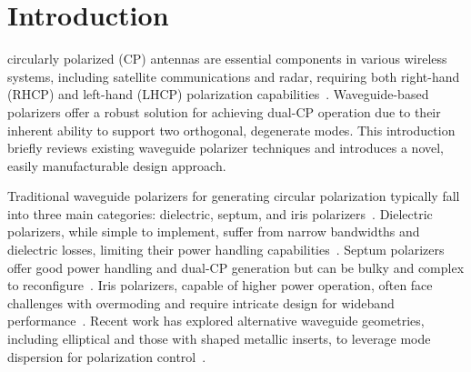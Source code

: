 \documentclass[journal,9pt]{IEEEtran}
\begin{document}
\section{Introduction}

 circularly polarized (CP) antennas are essential components in various wireless systems, including satellite communications and radar, requiring both right-hand (RHCP) and left-hand (LHCP) polarization capabilities~\cite{jia-et-al:dual-circularly-polarized-antennas-with-low-cross-polarization-for-gnss-r-applications, zang-et-al:single-layer-dual-circularly-polarized-antenna-elements-for-automotive-radar-at-77-ghz}. Waveguide-based polarizers offer a robust solution for achieving dual-CP operation due to their inherent ability to support two orthogonal, degenerate modes. This introduction briefly reviews existing waveguide polarizer techniques and introduces a novel, easily manufacturable design approach.

Traditional waveguide polarizers for generating circular polarization typically fall into three main categories: dielectric, septum, and iris polarizers~\cite{shuliak-et-al:modern-microwave-polarizers-and-their-electromagnetic-characteristics, arora-et-al:dielectric-polarizer-based-potter-horn-antenna-for-deep-space-on-board-ttc-uplink-applications}. Dielectric polarizers, while simple to implement, suffer from narrow bandwidths and dielectric losses, limiting their power handling capabilities~\cite{melendro-jimenez-et-al:a-novel-logarithmic-spiral-shaped-3d-printed-dielectirc-polarizer-for-dual-circularly-polarized-conical-beam-radiation-patterns-in-the-ka-band}. Septum polarizers offer good power handling and dual-CP generation but can be bulky and complex to reconfigure~\cite{ruiz-cruz-et-al:compact-reconfigurable-waveguide-circular-polarizer, wang-et-al:novel-square-rectangle-waveguide-septum-polarizer}. Iris polarizers, capable of higher power operation, often face challenges with overmoding and require intricate design for wideband performance~\cite{song-et-al:design-of-wideband-quad-ridge-waveguide-polarizer, virone-et-al:optimum-iris-set-concept-for-waveguide-polarizers, piltyay-et-al:new-tunable-iris-post-square-waveguide-polarizers-for-satelliste-information-systems}. Recent work has explored alternative waveguide geometries, including elliptical and those with shaped metallic inserts, to leverage mode dispersion for polarization control~\cite{yu-et-al:a-wideband-circularly-polarized-horn-antenna-with-a-tapered-elliptical-waveguide-polarizer, rud-shpachenko:polarizers-on-sections-of-square-waveguides-with-inner-corner-ridges, bhardwaj-volakis:hexagonal-waveguides-new-class-of-waveguides-for-mmwave-circularly-polarized-horns, bhardwaj-volakis:hexagonal-waveguide-based-circularly-polarized-horn-antennas-for-submmwave-terahertz-band, bhardwaj-volakis:circularly-polarized-horn-antennas-for-terahertz-communications-using-differential-mode-dispersion-in-hexagonal-waveguides, garcia-marin-masa-campos:bowtie-shaped-radiating-element-for-single-and-dual-circular-polarization}.
\end{document}
